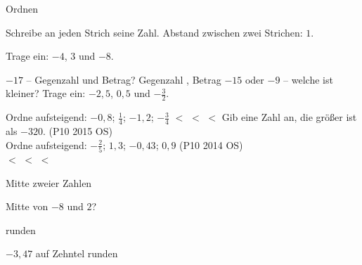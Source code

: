 \setcounter{aufgabe}{7}

\begin{aufgabe}{Ordnen}
\begin{teile}
\teil Schreibe an jeden Strich seine Zahl. Abstand zwischen zwei Strichen: $1$.

\teil Trage ein: $-4$, $3$ und $-8$.

\zahlenstrahl[xmin=-10,xmax=10,xstep=1]{}
\teil $-17$ – Gegenzahl und Betrag? Gegenzahl \leerfeld , Betrag \leerfeld
\teil $-15$ oder $-9$ – welche ist kleiner? \leerfeld
\teil Trage ein: $-2{,}5$, $0{,}5$ und $-\frac{3}{2}$.

\zahlenstrahl[xmin=-3,xmax=3,xstep=0.5,karo=1]{}
\teil Ordne aufsteigend: $-0{,}8$; $\frac{1}{4}$; $-1{,}2$; $-\frac{3}{4}$ \leerfeld $<$ \leerfeld $<$ \leerfeld $<$ \leerfeld
\teil Gib eine Zahl an, die größer ist als $-320$. \hfill (P10 2015 OS) \\ \leerfeld
\teil Ordne aufsteigend: $-\frac{2}{5}$; $1{,}3$; $-0{,}43$; $0{,}9$ \hfill (P10 2014 OS) \\ \leerfeld $<$ \leerfeld $<$ \leerfeld $<$ \leerfeld
\end{teile}
\end{aufgabe}

\begin{aufgabe}{Mitte zweier Zahlen}
\begin{teile}
\teil Mitte von $-8$ und $2$? \leerfeld
\end{teile}
\end{aufgabe}

\begin{aufgabe}{runden}
\begin{teile}
\teil $-3{,}47$ auf Zehntel runden \leerfeld
\end{teile}
\end{aufgabe}


